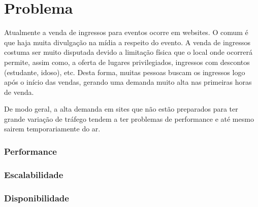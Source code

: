 \chapter{Problema}

Atualmente a venda de ingressos para eventos ocorre em websites.
O comum é que haja muita divulgação na mídia a respeito do evento.
A venda de ingressos costuma ser muito disputada devido a limitação
física que o local onde ocorrerá permite, assim como, a oferta de
lugares privilegiados, ingressos com descontos (estudante, idoso), etc.
Desta forma, muitas pessoas buscam os ingressos logo após o início das
vendas, gerando uma demanda muito alta nas primeiras horas de venda.

De modo geral, a alta demanda em sites que não estão preparados para
ter grande variação de tráfego tendem a ter problemas de performance
e até mesmo sairem temporariamente do ar.

\subsection{Performance}

\subsection{Escalabilidade}

\subsection{Disponibilidade}
